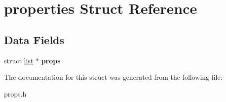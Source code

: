 \hypertarget{structproperties}{}\section{properties Struct Reference}
\label{structproperties}
\subsection*{Data Fields}
\begin{DoxyCompactItemize}
\item 
\hypertarget{structproperties_af2257eb0d72514728f3cda8c817b835b}{}struct \hyperlink{structlist}{list} $\ast$ {\bfseries props}\label{structproperties_af2257eb0d72514728f3cda8c817b835b}

\end{DoxyCompactItemize}


The documentation for this struct was generated from the following file\+:\begin{DoxyCompactItemize}
\item 
props.\+h\end{DoxyCompactItemize}
